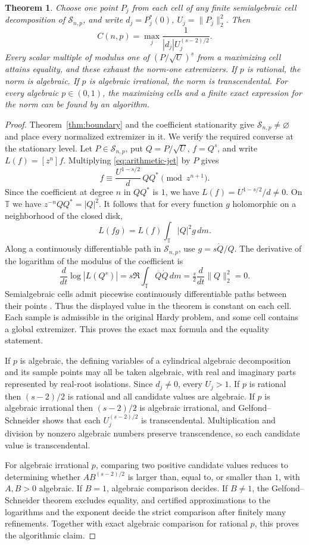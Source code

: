 \documentclass[11pt]{article}
\newtheorem{theorem}{Theorem}
\newcommand{\T}{\mathbb T}
\begin{document}
\begin{theorem}\label{thm:hardy-arithmetic}
Choose one point \(P_j\) from each cell of any finite semialgebraic
cell decomposition of \(\mathcal S_{n,p}\), and write
\(d_j=P_j^*(0)\), \(U_j=\|P_j\|_2^2\). Then
\[
 C(n,p)=\max_j\frac{1}{|d_j|U_j^{(s-2)/2}} .
\]
Every scalar multiple of modulus one of \((P/\sqrt U)^s\) from a
maximizing cell attains equality, and these exhaust the norm-one
extremizers. If \(p\) is rational, the norm is algebraic. If \(p\)
is algebraic irrational, the norm is transcendental. For every
algebraic \(p\in(0,1)\), the maximizing cells and a finite exact
expression for the norm can be found by an algorithm.
\end{theorem}

\begin{proof}
Theorem~\ref{thm:boundary} and the coefficient stationarity
give \(\mathcal S_{n,p}\ne\varnothing\) and place every
normalized extremizer in it. We verify the required converse at
the stationary level. Let \(P\in\mathcal S_{n,p}\), put
\(Q=P/\sqrt U\), \(f=Q^s\), and write \(L(f)=[z^n]f\).
Multiplying \eqref{eq:arithmetic-jet} by \(P\) gives
\[
 f\equiv \frac{U^{1-s/2}}{d}\,QQ^*\pmod{z^{n+1}} .
\]
Since the coefficient at degree \(n\) in \(QQ^*\) is \(1\),
we have \(L(f)=U^{1-s/2}/d\ne0\).
On \(\T\) we have \(z^{-n}QQ^*=|Q|^2\). It follows that for every
function \(g\) holomorphic on a neighborhood of the closed disk,
\[
 L(fg)=L(f)\int_{\T}|Q|^2g\,dm .
\]
Along a continuously differentiable path in \(\mathcal S_{n,p}\),
use \(g=s\dot Q/Q\). The derivative of the logarithm of the modulus
of the coefficient is
\[
 \frac{d}{dt}\log|L(Q^s)|
 = s\Re\int_{\T}\overline Q\dot Q\,dm
 =\tfrac{s}{2}\frac{d}{dt}\|Q\|_2^2=0 .
\]
Semialgebraic cells admit piecewise continuously differentiable
paths between their points \cite{BCR}. Thus the displayed value in the theorem
is constant on each cell. Each sample is admissible in the original
Hardy problem, and some cell contains a global extremizer. This
proves the exact max formula and the equality statement.

If \(p\) is algebraic, the defining variables of a cylindrical
algebraic decomposition and its sample points may all be taken
algebraic, with real and imaginary parts represented by real-root
isolations. Since \(d_j\ne0\), every \(U_j>1\).
If \(p\) is rational then \((s-2)/2\) is rational and all candidate
values are algebraic. If \(p\) is algebraic irrational then
\((s-2)/2\) is algebraic irrational, and Gelfond--Schneider shows
that each \(U_j^{(s-2)/2}\) is transcendental. Multiplication and
division by nonzero algebraic numbers preserve transcendence, so
each candidate value is transcendental.

For algebraic irrational \(p\), comparing two positive candidate
values reduces to determining whether \(A B^{(s-2)/2}\) is larger
than, equal to, or smaller than \(1\), with \(A,B>0\) algebraic.
If \(B=1\), algebraic comparison decides. If \(B\ne1\), the
Gelfond--Schneider theorem excludes equality, and certified
approximations to the logarithms and the exponent decide the strict
comparison after finitely many refinements. Together with exact
algebraic comparison for rational \(p\), this proves the algorithmic
claim.
\end{proof}
\end{document}
